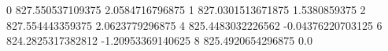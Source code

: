 0 827.550537109375 2.0584716796875
1 827.0301513671875 1.5380859375
2 827.554443359375 2.0623779296875
4 825.4483032226562 -0.04376220703125
6 824.2825317382812 -1.20953369140625
8 825.4920654296875 0.0
